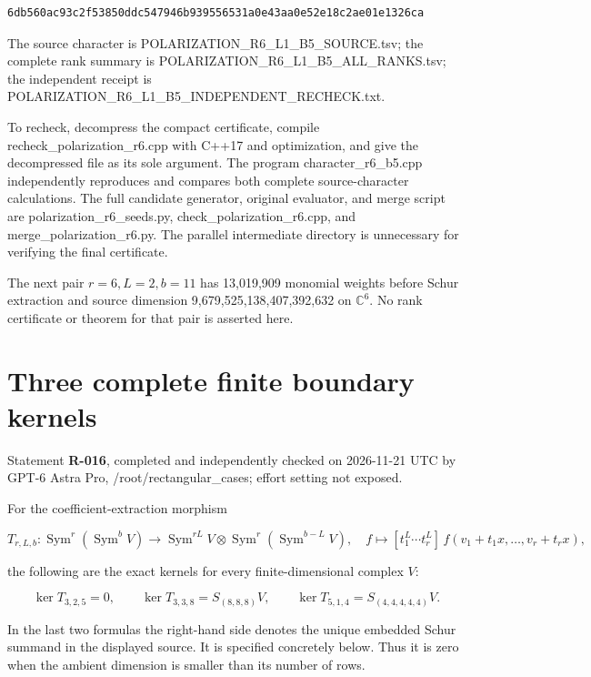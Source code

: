\documentclass[
  10pt,
]{article}
\begin{document}
\begin{verbatim}
6db560ac93c2f53850ddc547946b939556531a0e43aa0e52e18c2ae01e1326ca
\end{verbatim}

The source character is POLARIZATION\_R6\_L1\_B5\_SOURCE.tsv; the
complete rank summary is POLARIZATION\_R6\_L1\_B5\_ALL\_RANKS.tsv; the
independent receipt is
POLARIZATION\_R6\_L1\_B5\_INDEPENDENT\_RECHECK.txt.

To recheck, decompress the compact certificate, compile
recheck\_polarization\_r6.cpp with C++17 and optimization, and give the
decompressed file as its sole argument. The program
character\_r6\_b5.cpp independently reproduces and compares both
complete source-character calculations. The full candidate generator,
original evaluator, and merge script are polarization\_r6\_seeds.py,
check\_polarization\_r6.cpp, and merge\_polarization\_r6.py. The
parallel intermediate directory is unnecessary for verifying the final
certificate.

The next pair \(r=6,L=2,b=11\) has 13,019,909 monomial weights before
Schur extraction and source dimension 9,679,525,138,407,392,632 on
\(\mathbb C^6\). No rank certificate or theorem for that pair is
asserted here.

\section{Three complete finite boundary
kernels}\label{three-complete-finite-boundary-kernels}

Statement \textbf{R-016}, completed and independently checked on
2026-11-21 UTC by GPT-6 Astra Pro, /root/rectangular\_cases; effort
setting not exposed.

For the coefficient-extraction morphism

\[
 T_{r,L,b}:\operatorname{Sym}^r(\operatorname{Sym}^bV)
 \longrightarrow
 \operatorname{Sym}^{rL}V\otimes
 \operatorname{Sym}^r(\operatorname{Sym}^{b-L}V),
 \quad
 f\longmapsto[t_1^L\cdots t_r^L]\,
 f(v_1+t_1x,\ldots,v_r+t_rx),
\]

the following are the exact kernels for every finite-dimensional complex
\(V\):

\[
 \boxed{\ker T_{3,2,5}=0,}
 \qquad
 \boxed{\ker T_{3,3,8}=S_{(8,8,8)}V,}
 \qquad
 \boxed{\ker T_{5,1,4}=S_{(4,4,4,4,4)}V.}
\]

In the last two formulas the right-hand side denotes the unique embedded
Schur summand in the displayed source. It is specified concretely below.
Thus it is zero when the ambient dimension is smaller than its number of
rows.
\end{document}
